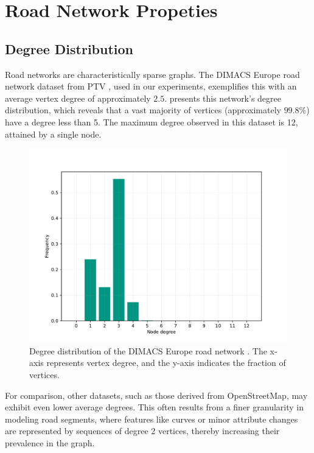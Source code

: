 \chapter{Road Network Propeties}
\label{ch:properties}


\section{Degree Distribution}
\label{sec:degree_distribution}

Road networks are characteristically sparse graphs.
The DIMACS Europe road network dataset from PTV \cite{ptv_group_dimacs-europe_2009}, used in our experiments, exemplifies this with an average vertex degree of approximately \(2.5\).
 presents this network's degree distribution, which reveals that a vast majority of vertices (approximately \(99.8\%\)) have a degree less than 5.
The maximum degree observed in this dataset is 12, attained by a single node.

\begin{figure}[tbhp]
	\centering
	\includegraphics[width=0.6\linewidth]{graphics/degree_overview_europe.pdf}
	\caption{Degree distribution of the DIMACS Europe road network \cite{ptv_group_dimacs-europe_2009}. The x-axis represents vertex degree, and the y-axis indicates the fraction of vertices.}
	\label{fig:degree_dist_europe}
\end{figure}

For comparison, other datasets, such as those derived from OpenStreetMap, may exhibit even lower average degrees.
This often results from a finer granularity in modeling road segments, where features like curves or minor attribute changes are represented by sequences of degree 2 vertices, thereby increasing their prevalence in the graph.

